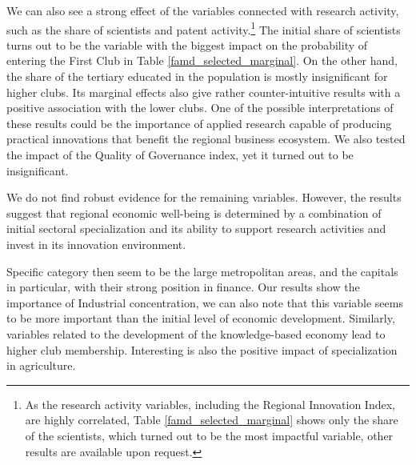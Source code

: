\documentclass[11pt]{article}
\begin{document}
We can also see a strong effect of the variables connected with research activity, such as the share of scientists and patent activity.\footnote{As the research activity variables, including the Regional Innovation Index, are highly correlated, Table \ref{famd_selected_marginal} shows only the share of the scientists, which turned out to be the most impactful variable, other results are available upon request.} The initial share of scientists turns out to be the variable with the biggest impact on the probability of entering the First Club in Table \ref{famd_selected_marginal}.
On the other hand, the share of the tertiary educated in the population is mostly insignificant for higher clubs. Its marginal effects also give rather counter-intuitive results with a positive association with the lower clubs. One of the possible interpretations of these results could be the importance of applied research capable of producing practical innovations that benefit the regional business ecosystem. We also tested the impact of the Quality of Governance index, yet it turned out to be insignificant.

We do not find robust evidence for the remaining variables. However, the results suggest that regional economic well-being is determined by a combination of initial sectoral specialization and its ability to support research activities and invest in its innovation environment.

Specific category then seem to be the large metropolitan areas, and the capitals in particular, with their strong position in finance. Our results show the importance of Industrial concentration, we can also note that this variable seems to be more important than the initial level of economic development. Similarly, variables related to the development of the knowledge-based economy lead to higher club membership. Interesting is also the positive impact of specialization in agriculture. 
\end{document}
